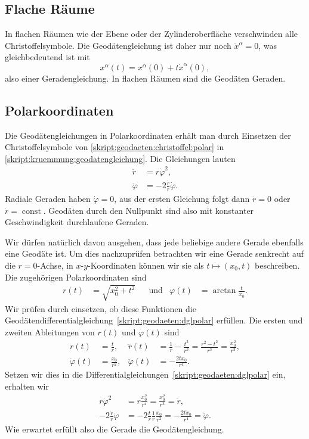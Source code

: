 \subsection{Flache Räume}
In flachen Räumen wie der Ebene oder der Zylinderoberfläche verschwinden
alle Christoffelsymbole.
Die Geodätengleichung ist daher nur noch
$\ddot x^\alpha=0$, was gleichbedeutend ist mit
\[
x^\alpha(t)=x^\alpha(0) + t \dot x^\alpha(0),
\]
also einer Geradengleichung.
In flachen Räumen sind die Geodäten Geraden.

\subsection{Polarkoordinaten}
Die Geodätengleichungen in Polarkoordinaten erhält man durch
Einsetzen der Christoffelsymbole von
\eqref{skript:geodaeten:christoffel:polar}
in
\eqref{skript:kruemmung:geodatengleichung}.
Die Gleichungen lauten
\begin{equation}
\begin{aligned}
\ddot r &= r\dot \varphi^2,
\\
\ddot \varphi &= -2\frac{\dot r}{r}\dot\varphi.
\end{aligned}
\label{skript:geodaeten:dglpolar}
\end{equation}
Radiale Geraden haben $\dot\varphi=0$, aus der ersten Gleichung folgt dann
$\ddot r=0$ oder $\dot r=\operatorname{const}$.
Geodäten durch den Nullpunkt sind also mit konstanter Geschwindigkeit
durchlaufene Geraden.

Wir dürfen natürlich davon ausgehen, dass jede beliebige andere Gerade
ebenfalls eine Geodäte ist.
Um dies nachzuprüfen betrachten wir eine Gerade senkrecht auf die
$r=0$-Achse, in $x$-$y$-Koordinaten können wir sie als
$t\mapsto (x_0,t)$ beschreiben.
Die zugehörigen Polarkoordinaten sind
\[
\begin{aligned}
r(t)&=\sqrt{x_0^2+t^2}
&&\text{und}&
\varphi(t)&=\arctan\frac{t}{x_0}.
\end{aligned}
\]
Wir prüfen durch einsetzen, ob diese Funktionen die
Geodätendifferentialgleichung~\eqref{skript:geodaeten:dglpolar}
erfüllen.
Die ersten und zweiten Ableitungen von $r(t)$ und $\varphi(t)$ sind
\begin{align*}
\dot r(t)
&=\frac{t}{r},
&
\ddot r(t)
&=
\frac{1}{r}-\frac{t^2}{r^3}
=
\frac{r^2-t^2}{r^3}
=
\frac{x_0^2}{r^3},
\\
\dot\varphi(t)
&=
\frac{x_0}{r^2},
&
\ddot\varphi(t)
&=
-\frac{2tx_0}{r^4}.
\end{align*}
Setzen wir dies in die
Differentialgleichungen~\eqref{skript:geodaeten:dglpolar}
ein, erhalten wir
\begin{align*}
r\dot\varphi^2
&=
r\frac{x_0^2}{r^4}
=
\frac{x_0^2}{r^3}
=
\ddot r,
\\
-2\frac{\dot r}{r}\dot\varphi
&=
-2\frac{t}{r}\frac1{r}\frac{x_0}{r^2}
=
-\frac{2tx_0}{r^4}
=
\ddot\varphi.
\end{align*}
Wie erwartet erfüllt also die Gerade die Geodätengleichung.

